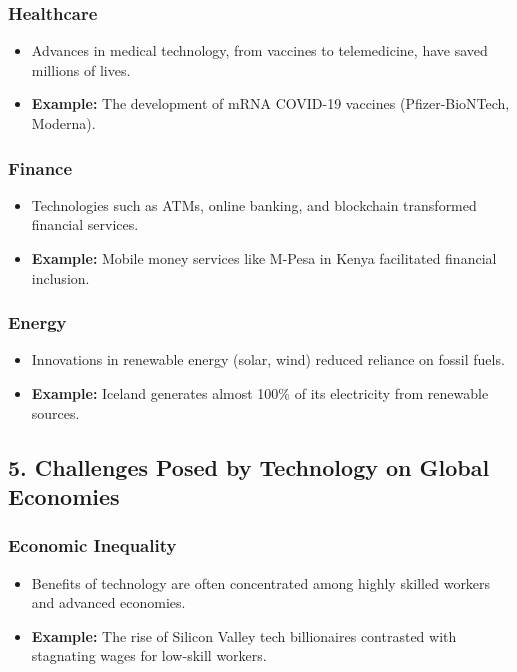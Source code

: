 \documentclass{article}
\begin{document}
\subsubsection*{ Healthcare}
\begin{itemize}
    \item Advances in medical technology, from vaccines to telemedicine, have saved millions of lives.
    \item \textbf{Example:} The development of mRNA COVID-19 vaccines (Pfizer-BioNTech, Moderna).
\end{itemize}

\subsubsection*{ Finance}
\begin{itemize}
    \item Technologies such as ATMs, online banking, and blockchain transformed financial services.
    \item \textbf{Example:} Mobile money services like M-Pesa in Kenya facilitated financial inclusion.
\end{itemize}

\subsubsection*{ Energy}
\begin{itemize}
    \item Innovations in renewable energy (solar, wind) reduced reliance on fossil fuels.
    \item \textbf{Example:} Iceland generates almost 100\% of its electricity from renewable sources.
\end{itemize}

\subsection*{5. Challenges Posed by Technology on Global Economies}

\subsubsection*{ Economic Inequality}
\begin{itemize}
    \item Benefits of technology are often concentrated among highly skilled workers and advanced economies.
    \item \textbf{Example:} The rise of Silicon Valley tech billionaires contrasted with stagnating wages for low-skill workers.
\end{itemize}
\end{document}

